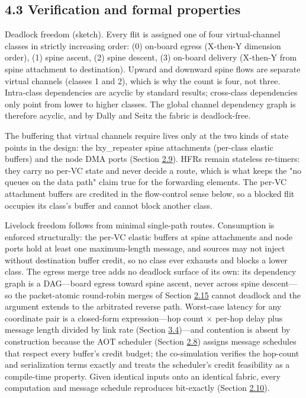 \documentclass[10pt,twocolumn]{article}
\begin{document}
\subsection*{4.3 Verification and formal properties}\label{sec:4.3}

Deadlock freedom (sketch). Every flit is assigned one of four virtual-channel classes in strictly increasing order: (0) on-board egress (X-then-Y dimension order), (1) spine ascent, (2) spine descent, (3) on-board delivery (X-then-Y from spine attachment to destination). Upward and downward spine flows are separate virtual channels (classes 1 and 2), which is why the count is four, not three. Intra-class dependencies are acyclic by standard results; cross-class dependencies only point from lower to higher classes. The global channel dependency graph is therefore acyclic, and by Dally and Seitz the fabric is deadlock-free\cite{13,14}.

The buffering that virtual channels require lives only at the two kinds of state points in the design: the lxy\_repeater spine attachments (per-class elastic buffers) and the node DMA ports (Section \hyperref[sec:2.9]{2.9}). HFRs remain stateless re-timers: they carry no per-VC state and never decide a route, which is what keeps the "no queues on the data path" claim true for the forwarding elements. The per-VC attachment buffers are credited in the flow-control sense below, so a blocked flit occupies its class's buffer and cannot block another class.

Livelock freedom follows from minimal single-path routes. Consumption is enforced structurally: the per-VC elastic buffers at spine attachments and node ports hold at least one maximum-length message, and sources may not inject without destination buffer credit, so no class ever exhausts and blocks a lower class. The egress merge tree adds no deadlock surface of its own: its dependency graph is a DAG---board egress toward spine ascent, never across spine descent---so the packet-atomic round-robin merges of Section \hyperref[sec:2.15]{2.15} cannot deadlock and the argument extends to the arbitrated reverse path. Worst-case latency for any coordinate pair is a closed-form expression---hop count $\times$ per-hop delay plus message length divided by link rate (Section \hyperref[sec:3.4]{3.4})---and contention is absent by construction because the AOT scheduler (Section \hyperref[sec:2.8]{2.8}) assigns message schedules that respect every buffer's credit budget; the co-simulation verifies the hop-count and serialization terms exactly and treats the scheduler's credit feasibility as a compile-time property. Given identical inputs onto an identical fabric, every computation and message schedule reproduces bit-exactly (Section \hyperref[sec:2.10]{2.10}).
\end{document}
